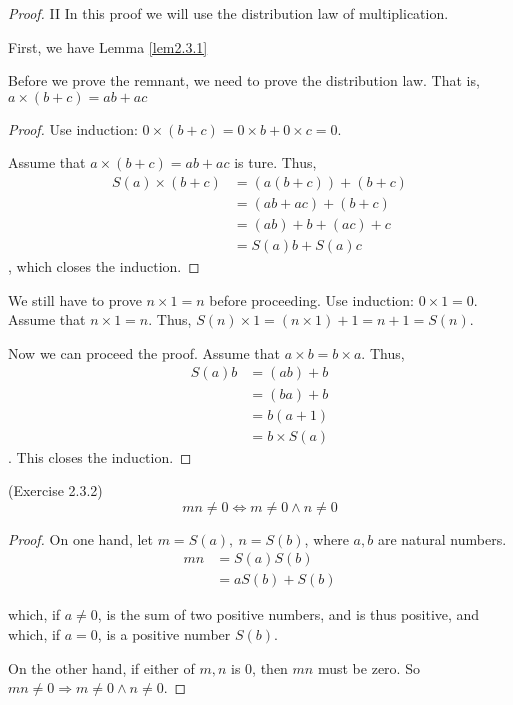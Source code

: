\begin{proof} II In this proof we will use the distribution law of multiplication.

First, we have Lemma \ref{lem2.3.1}

Before we prove the remnant, we need to prove the distribution law. That 
is, $a \times (b+c) = ab + ac$ \label{distriLaw}
\begin{proof}
Use induction: $0 \times (b+c)= 0\times b+0\times c=0$.

Assume that $a \times (b+c) = ab + ac$ is ture. Thus, 
\begin{align*}
S(a) \times (b+c)
&= (a(b+c))+(b+c) \\
&= (ab+ac)+(b+c) \tag{By assumption} \\
&= (ab)+b+(ac)+c \\
&= S(a)b+S(a)c
\end{align*}, which closes the induction.
\end{proof}

We still have to prove $n \times 1 = n$ before proceeding. Use induction: $0 \times 1 = 0$. Assume that 
$n \times 1 = n$. Thus, $S(n) \times 1 = (n\times 1)+1=n+1=S(n)$.

Now we can proceed the proof. Assume that $a \times b = b \times a$. Thus, 
\begin{align*}
S(a)b
&= (ab)+b \\
&= (ba)+b \tag{By assumption} \\
&= b(a+1) \tag{By $b\times 1=b$ and the distribution law}\\
&= b \times S(a)
\end{align*}. This closes the induction.
\end{proof}

\begin{lem} \label{lem2.3.3}
(Exercise 2.3.2) \label{exercise2.3.2}
\[mn \neq 0 \Leftrightarrow m \neq 0 \wedge n \neq 0\]
\end{lem}

\begin{proof}
On one hand,
let $m=S(a),\ n=S(b)$, where $a,b$ are natural numbers.
\begin{align*}
mn 
&= S(a)S(b) \\
&= aS(b) + S(b)
\end{align*}

which, if $a \neq 0$, is the sum of two positive numbers, and is thus positive, and which, if $a = 0$,
is a positive number $S(b)$.

On the other hand, if either of $m,n$ is 0, then $mn$ must be zero. So $mn \neq 0 \Rightarrow m \neq 0 
\wedge n \neq 0$.
\end{proof}


